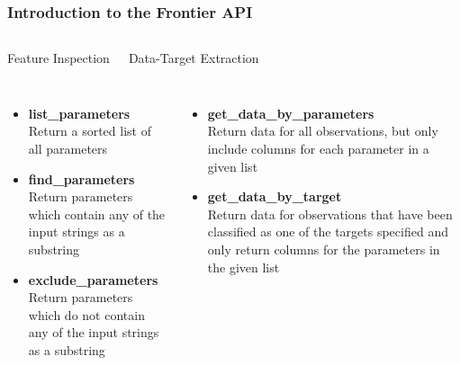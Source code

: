 \documentclass{beamer}
\begin{document}
\begin{frame}[t]
\frametitle{Introduction to the Frontier API}

    \begin{columns}[c]
    \column{5.5cm}
        \begin{beamerboxesrounded}[shadow=true]{}
            \begin{center}
                Feature Inspection
            \end{center}
        \end{beamerboxesrounded}
    \column{5.5cm}
        \begin{beamerboxesrounded}[shadow=true]{}
            \begin{center}
                Data-Target Extraction
            \end{center}
        \end{beamerboxesrounded}
    \end{columns}
    \begin{columns}[c]
    \column{5.5cm}
        \begin{itemize}
            \item \textbf{list\_parameters} \hfill\\
                Return a sorted list of all parameters
            \item \textbf{find\_parameters} \hfill\\
                Return parameters which contain
                any of the input strings as a substring
            \item \textbf{exclude\_parameters} \hfill\\
                Return parameters which do not
                contain any of the input strings as a substring
        \end{itemize}
    \column{5.5cm}
        \begin{itemize}
            \item \textbf{get\_data\_by\_parameters} \hfill\\
                Return data for all observations, but only include columns
                for each parameter in a given list
            \item \textbf{get\_data\_by\_target} \hfill\\
                Return data for observations that have been classified as one of
                the targets specified and only return columns for the
                parameters in the given list
        \end{itemize}
    \end{columns}
\end{frame}
\end{document}

